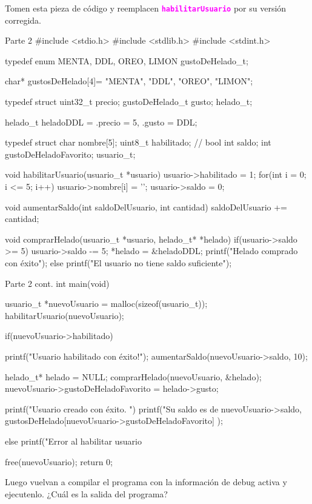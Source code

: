 \documentclass[]{scrartcl}
\newcommand{\hl}[1]{\textcolor{magenta}{\textbf{\texttt{#1}}}}
\begin{document}
Tomen esta pieza de código y reemplacen \hl{habilitarUsuario} por su versión corregida.
\begin{cbox}[]{Parte 2}
#include <stdio.h>
#include <stdlib.h>
#include <stdint.h>

typedef enum{
    MENTA,
    DDL,
    OREO,
    LIMON
} gustoDeHelado_t;

char* gustosDeHelado[4]= {"MENTA", "DDL", "OREO", "LIMON"};

typedef struct{
    uint32_t precio;
    gustoDeHelado_t gusto;
} helado_t;

helado_t heladoDDL = {.precio = 5, .gusto = DDL}; 

typedef struct{
    char nombre[5];
    uint8_t habilitado; // bool
    int saldo;
    int gustoDeHeladoFavorito;
} usuario_t;

void habilitarUsuario(usuario_t *usuario){
    usuario->habilitado = 1;
    for(int i = 0; i <= 5; i++){
        usuario->nombre[i] = '\0';
    }
    usuario->saldo = 0;
}

void aumentarSaldo(int saldoDelUsuario, int cantidad){
    saldoDelUsuario += cantidad;
}

void comprarHelado(usuario_t *usuario, helado_t* *helado){
    if(usuario->saldo >= 5){
        usuario->saldo -= 5;
        *helado = &heladoDDL;
        printf("Helado comprado con éxito\n");
    }else{
        printf("El usuario no tiene saldo suficiente\n");
    }
}
\end{cbox}
\begin{cbox}[]{Parte 2 cont.}
int main(void){
    usuario_t *nuevoUsuario = malloc(sizeof(usuario_t));
    habilitarUsuario(nuevoUsuario);
 
    if(nuevoUsuario->habilitado){
        printf("Usuario habilitado con éxito!\n");
        aumentarSaldo(nuevoUsuario->saldo, 10);

        helado_t* helado = NULL;
        comprarHelado(nuevoUsuario, &helado);
        nuevoUsuario->gustoDeHeladoFavorito = helado->gusto;
      
        printf("Usuario creado con éxito. \n")
        printf("Su saldo es de %
               nuevoUsuario->saldo, 
               gustosDeHelado[nuevoUsuario->gustoDeHeladoFavorito]
        );
    } else{
        printf("Error al habilitar usuario %
    }
  
    free(nuevoUsuario);
    return 0;
}
\end{cbox}

Luego vuelvan a compilar el programa con la información de debug activa y ejecutenlo. ¿Cuál es la salida del programa?
\end{document}

